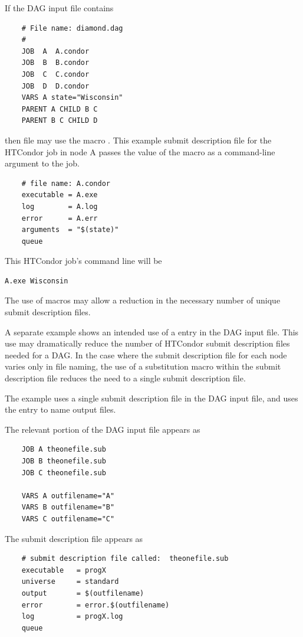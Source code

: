
If the DAG input file contains
\footnotesize
\begin{verbatim}
    # File name: diamond.dag
    #
    JOB  A  A.condor 
    JOB  B  B.condor 
    JOB  C  C.condor	
    JOB  D  D.condor
    VARS A state="Wisconsin"
    PARENT A CHILD B C
    PARENT B C CHILD D

\end{verbatim}
\normalsize

then file  may use the macro \verb@state@.
This example submit description file for the HTCondor
job in node A passes the value
of the macro as a command-line argument to the job.

\footnotesize
\begin{verbatim}
    # file name: A.condor
    executable = A.exe
    log        = A.log
    error      = A.err
    arguments  = "$(state)"
    queue
\end{verbatim}
\normalsize

This HTCondor job's command line will be
\footnotesize
\begin{verbatim}
A.exe Wisconsin
\end{verbatim}
\normalsize
The use of macros may allow a reduction in the necessary number 
of unique submit description files.

A separate example shows an intended use of a  entry
in the DAG input file.
This use may dramatically reduce the number of HTCondor submit description
files needed for a DAG.
In the case where the submit description file for each node
varies only in file naming, the use of a substitution macro
within the submit description file reduces the need to
a single submit description file.

The example uses a single submit description file in the DAG input
file, and uses the  entry to name output files.

The relevant portion of the DAG input file appears as 
\begin{verbatim}
    JOB A theonefile.sub
    JOB B theonefile.sub
    JOB C theonefile.sub

    VARS A outfilename="A"
    VARS B outfilename="B"
    VARS C outfilename="C"
\end{verbatim}

The submit description file appears as 
\footnotesize
\begin{verbatim}
    # submit description file called:  theonefile.sub
    executable   = progX
    universe     = standard
    output       = $(outfilename)
    error        = error.$(outfilename)
    log          = progX.log
    queue
\end{verbatim}
\normalsize


